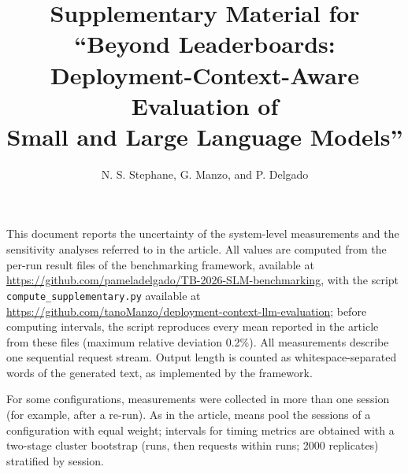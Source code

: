 \documentclass[10pt]{article}
\title{Supplementary Material for\\[2pt]
``Beyond Leaderboards: Deployment-Context-Aware Evaluation of\\ Small and Large Language Models''}
\author{N. S. Stephane, G. Manzo, and P. Delgado}
\date{}
\begin{document}
\maketitle

\noindent
This document reports the uncertainty of the system-level measurements and the
sensitivity analyses referred to in the article. All values are computed from the
per-run result files of the benchmarking framework, available at
\url{https://github.com/pameladelgado/TB-2026-SLM-benchmarking}, with the script
\texttt{compute\_supplementary.py} available at
\url{https://github.com/tanoManzo/deployment-context-llm-evaluation}; before computing intervals, the script
reproduces every mean reported in the article from these files (maximum relative
deviation 0.2\%). All measurements describe one sequential request stream.
Output length is counted as whitespace-separated words of the generated text, as
implemented by the framework.

For some configurations, measurements were collected in more than one session
(for example, after a re-run). As in the article, means pool the sessions of a
configuration with equal weight; intervals for timing metrics are obtained with
a two-stage cluster bootstrap (runs, then requests within runs; 2000 replicates)
stratified by session.

\begingroup\scriptsize\setlength{\tabcolsep}{3pt}


\endgroup

\begingroup\small

\endgroup

\begingroup\scriptsize\setlength{\tabcolsep}{4pt}


\endgroup
\end{document}
